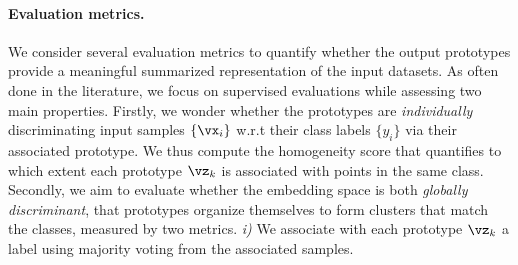 \paragraph{Evaluation metrics.}
We consider several evaluation metrics to quantify whether the output prototypes provide a meaningful summarized representation of the input datasets. As often done in the literature, we focus on supervised evaluations while assessing two main properties.
Firstly, we wonder whether the prototypes are \emph{individually} discriminating
input samples $\{\vx_i\}$ w.r.t their class labels $\{y_i\}$ via their
associated prototype. We thus
compute the homogeneity score \citep{rosenberg2007v} that quantifies to which
extent each prototype $\vz_k$ is associated with points in the same class. 
Secondly, we aim to evaluate whether the embedding space is both \emph{globally discriminant}, \ie that prototypes organize themselves to form clusters that match the classes, measured by two metrics. \emph{i)} 
We associate with each prototype $\vz_k$ a label using majority voting from the associated samples.

